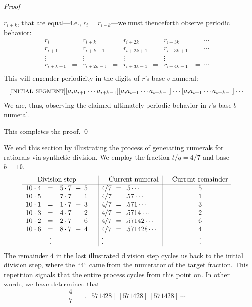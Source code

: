 \begin{proof}
\begin{enumerate}
$r_{i+k}$, that are equal---i.e., $r_i = r_{i+k}$---we must
thenceforth observe periodic behavior:
\[
\begin{array}{cccccccc}
r_i       & = & r_{i+k}    & = & r_{i+2k}   & = & r_{i+3k}   & = \ \cdots \\
r_{i+1}   & = & r_{i+k+1}  & = & r_{i+2k+1} & = & r_{i+3k+1} & = \ \cdots \\
\vdots    &   & \vdots     &   & \vdots     &   & \vdots     & \\
r_{i+k-1} & = & r_{i+2k-1} & = & r_{i+3k-1} & = & r_{i+4k-1} & = \ \cdots \\
\end{array}
\]
This will engender periodicity in the digits of $r$'s base-$b$ numeral:
\[ [\mbox{\sc initial segment}]
 [a_i a_{i+1} \cdots a_{i+k-1}]
          [a_i a_{i+1} \cdots a_{i+k-1}]
    \cdots  [a_i a_{i+1} \cdots a_{i+k-1}] \cdots 
\]
We are, thus, observing the claimed ultimately periodic behavior in
$r$'s base-$b$ numeral.
\end{enumerate}
This completes the proof. \qed
\end{proof}

\bigskip

We end this section by illustrating the process of generating numerals
for rationals via synthetic division.  We employ the fraction $t/q = 4/7$
and base $b = 10$.
\[
\begin{array}{lclc|l|cc}
\multicolumn{3}{c}{\mbox{Division step}} & &  \hspace*{.15in} \mbox{Current numeral} & &
\mbox{Current remainder} \\
\hline
10 \cdot 4   & = & 5 \cdot 7 \ + \ 5 &
      & 4/7 \ = \ .5 \cdots &
      & 5 \\
10 \cdot 5 & = & 7 \cdot 7 \ + \ 1 &
      & 4/7 \ = \ .57 \cdots &
      & 1 \\
10 \cdot 1 & = & 1 \cdot 7 \ + \ 3 &
      & 4/7 \ = \ .571 \cdots &
      & 3 \\
10 \cdot 3 & = & 4 \cdot 7 \ + \ 2 &
      & 4/7 \ = \ .5714 \cdots &
      & 2 \\
10 \cdot 2 & = & 2 \cdot 7 \ + \ 6 &
      & 4/7 \ = \ .57142 \cdots &
      & 6 \\
10 \cdot 6 & = & 8 \cdot 7 \ + \ 4 &
      & 4/7 \ = \ .571428 \cdots &
      & 4 \\
 & \vdots & & & \vdots & & \vdots
\end{array}
\]
The remainder $4$ in the last illustrated division step cycles us back
to the initial division step, where the ``$4$'' came from the
numerator of the target fraction.  This repetition signals that the
entire process cycles from this point on.  In other words, we have
determined that
\[ \frac{4}{7} \ = \ .[571428] \ [571428] \ [571428] \ \cdots \]

